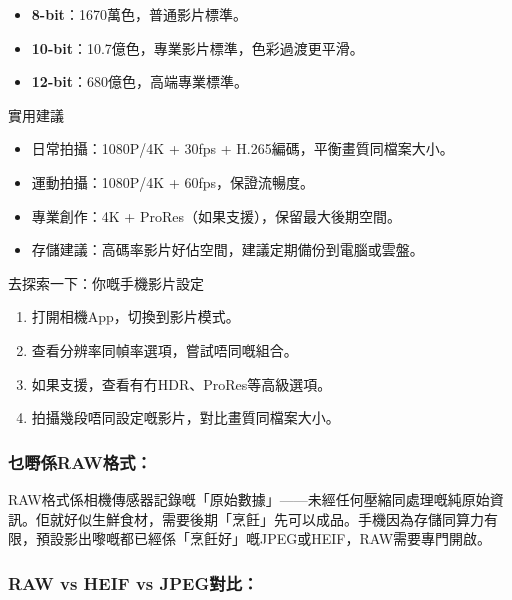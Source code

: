 \begin{itemize}
  \item \textbf{8-bit}：1670萬色，普通影片標準。
  \item \textbf{10-bit}：10.7億色，專業影片標準，色彩過渡更平滑。
  \item \textbf{12-bit}：680億色，高端專業標準。
\end{itemize}

\begin{tcbinfo}{實用建議}
\begin{itemize}
  \item 日常拍攝：1080P/4K + 30fps + H.265編碼，平衡畫質同檔案大小。
  \item 運動拍攝：1080P/4K + 60fps，保證流暢度。
  \item 專業創作：4K + ProRes（如果支援），保留最大後期空間。
  \item 存儲建議：高碼率影片好佔空間，建議定期備份到電腦或雲盤。
\end{itemize}

\end{tcbinfo}

\begin{tcbpractice}{去探索一下：你嘅手機影片設定}
\begin{enumerate}
  \item 打開相機App，切換到影片模式。
  \item 查看分辨率同幀率選項，嘗試唔同嘅組合。
  \item 如果支援，查看有冇HDR、ProRes等高級選項。
  \item 拍攝幾段唔同設定嘅影片，對比畫質同檔案大小。
\end{enumerate}

\end{tcbpractice}


\subsubsection*{乜嘢係RAW格式：}

RAW格式係相機傳感器記錄嘅「原始數據」——未經任何壓縮同處理嘅純原始資訊。佢就好似生鮮食材，需要後期「烹飪」先可以成品。手機因為存儲同算力有限，預設影出嚟嘅都已經係「烹飪好」嘅JPEG或HEIF，RAW需要專門開啟。

\subsubsection*{RAW vs HEIF vs JPEG對比：}

